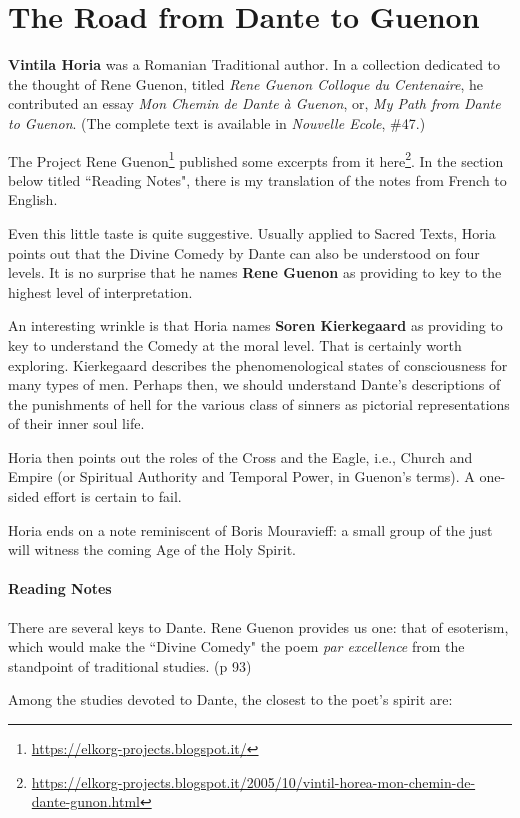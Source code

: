 \section{The Road from Dante to Guenon}

\textbf{Vintila Horia} was a Romanian Traditional author. In a collection dedicated to the thought of Rene Guenon, titled \emph{Rene Guenon Colloque du Centenaire}, he contributed an essay \emph{Mon Chemin de Dante à Guenon}, or, \emph{My Path from Dante to Guenon}. (The complete text is available in \emph{Nouvelle Ecole}, \#47.)

The Project Rene Guenon\footnote{\url{https://elkorg-projects.blogspot.it/}} published some excerpts from it here\footnote{\url{https://elkorg-projects.blogspot.it/2005/10/vintil-horea-mon-chemin-de-dante-gunon.html}}. In the section below titled ``Reading Notes", there is my translation of the notes from French to English.

Even this little taste is quite suggestive. Usually applied to Sacred Texts, Horia points out that the Divine Comedy by Dante can also be understood on four levels. It is no surprise that he names \textbf{Rene Guenon} as providing to key to the highest level of interpretation.

An interesting wrinkle is that Horia names \textbf{Soren Kierkegaard} as providing to key to understand the Comedy at the moral level. That is certainly worth exploring. Kierkegaard describes the phenomenological states of consciousness for many types of men. Perhaps then, we should understand Dante's descriptions of the punishments of hell for the various class of sinners as pictorial representations of their inner soul life.

Horia then points out the roles of the Cross and the Eagle, i.e., Church and Empire (or Spiritual Authority and Temporal Power, in Guenon's terms). A one-sided effort is certain to fail.

Horia ends on a note reminiscent of Boris Mouravieff: a small group of the just will witness the coming Age of the Holy Spirit.

\paragraph{Reading Notes}
There are several keys to Dante. Rene Guenon provides us one: that of esoterism, which would make the ``Divine Comedy" the poem \emph{par excellence} from the standpoint of traditional studies. (p 93)

Among the studies devoted to Dante, the closest to the poet's spirit are:

